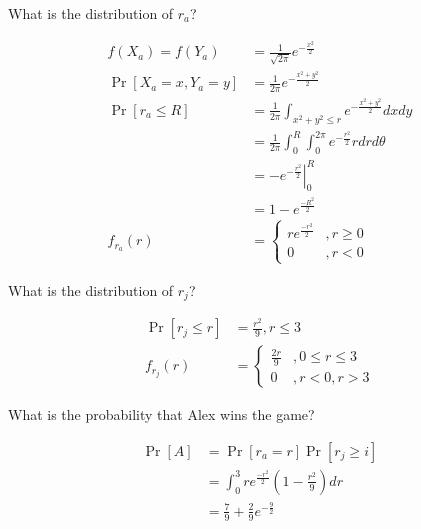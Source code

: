 \documentclass[11pt]{article}
\newcommand*\Eval[3]{\left.#1\right\rvert_{#2}^{#3}}
\begin{document}
\newpage
{}

\begin{Parts}
    
    \Part What is the distribution of $r_a$? 

    \begin{Answer}
        \begin{align*}
            f(X_a) = f(Y_a)   &= \frac{1}{\sqrt{2\pi}} e^{-\frac{x^2}{2}} \\
            \Pr[X_a=x,Y_a=y]  &= \frac{1}{2\pi}e^{-\frac{x^2+y^2}{2}} \\
            \Pr[r_a \leq R]   &= \frac{1}{2\pi}\int_{x^2+y^2\leq r} e^{-\frac{x^2+y^2}{2}} dx dy \\
                              &= \frac{1}{2\pi}\int_0^R \int_0^{2\pi} e^{-\frac{r^2}{2}}r dr d\theta \\
                              &= \Eval{-e^{-\frac{r^2}{2}}}{0}{R} \\
                              &= 1 - e^{\frac{-R^2}{2}} \\
            f_{r_a}(r)        &= \begin{cases}
                re^{\frac{-r^2}{2}} &, r \geq 0 \\
                0                   &, r < 0
            \end{cases}
        \end{align*}
    \end{Answer}

    \Part What is the distribution of $r_j$? 

    \begin{Answer}
        \begin{align*}
            \Pr[r_j \leq r] &= \frac{r^2}{9}, r \leq 3 \\
            f_{r_j}(r)      &= \begin{cases}
                \frac{2r}{9} &, 0 \leq r \leq 3 \\
                0            &, r < 0, r > 3
            \end{cases}
        \end{align*}
    \end{Answer}

    \Part What is the probability that Alex wins the game? 

    \begin{Answer}
        \begin{align*}
            \Pr[A] &= \Pr[r_a=r]\Pr[r_j \geq i] \\
                   &= \int_0^3 re^{\frac{-r^2}{2}}(1 - \frac{r^2}{9}) dr \\
                   &= \frac{7}{9} + \frac{2}{9}e^{-\frac{9}{2}}
        \end{align*}
    \end{Answer}

\end{Parts}
\end{document}
